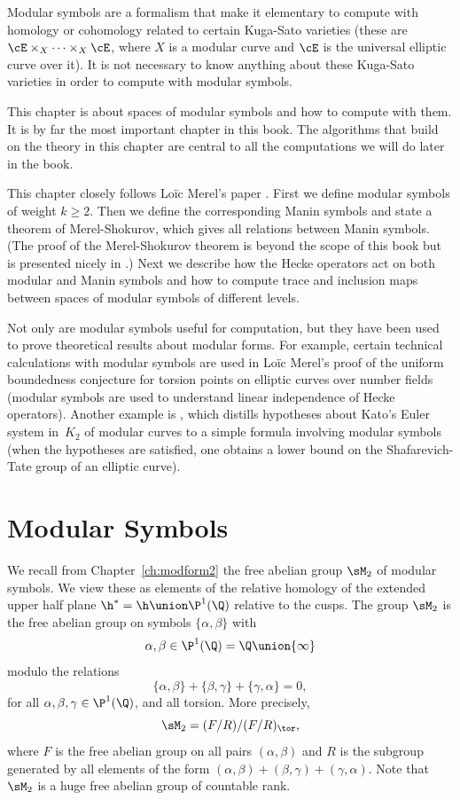 Modular symbols are a formalism that make it 
elementary to compute with homology or cohomology related to certain
Kuga-Sato varieties (these are $\cE\times_X \cdots \times_X \cE$,
where $X$ is a modular curve and $\cE$ is the universal elliptic curve
over it).  It is not necessary to know anything about these Kuga-Sato
varieties in order to compute with modular symbols.

This chapter is about spaces of modular symbols and how to compute
with them.  It is by far the most important chapter in this book.  The
algorithms that build on the theory in this chapter are central to all
the computations we will do later in the book.

This chapter closely follows Lo\"{i}c Merel's paper \cite{merel:1585}.
First we define modular symbols of weight $k\geq 2$.  Then we define
the corresponding Manin symbols and state a theorem of
Merel-Shokurov, which gives all relations between Manin symbols.  (The
proof of the Merel-Shokurov theorem is beyond the scope of this book
but is presented nicely in \cite{gabor:phd}.)
Next we describe how the Hecke operators act on both modular and Manin
symbols and how to compute trace and inclusion maps between spaces of
modular symbols of different levels.

Not only are modular symbols useful for computation, but they have
been used to prove theoretical results about modular forms.  For
example, certain technical calculations with modular symbols are used
in Lo\"{i}c Merel's proof of the uniform boundedness conjecture for
torsion points on elliptic curves over number fields (modular symbols
are used to understand linear independence of Hecke
operators).  Another example is \cite{grigor:phd}, which
distills hypotheses about Kato's Euler system in~$K_2$ of modular
curves to a simple formula involving modular symbols (when the
hypotheses are satisfied, one obtains a lower bound on the
Shafarevich-Tate group of an elliptic curve).

\section{Modular Symbols}\label{sec:modsymgen}
We recall from Chapter~\ref{ch:modform2}
the free abelian group $\sM_2$ of modular symbols.
We view these as elements of the relative 
homology of the extended upper half plane
$\h^* = \h\union \P^1(\Q)$ relative to the cusps.  
The group $\sM_2$
is the free abelian group on symbols $\{\alpha,\beta\}$ with 
$$\alpha, \beta \in \P^1(\Q) = \Q \union \{\infty\}$$
modulo the relations
$$
  \{\alpha,\beta\} + \{\beta,\gamma\} + \{\gamma,\alpha\} = 0,
$$
for all $\alpha,\beta,\gamma\in\P^1(\Q)$, and all torsion.
More precisely, $$\sM_2 =
(F/R)/(F/R)_{\tor},$$ where $F$ is the free abelian group on all pairs
$(\alpha,\beta)$ and $R$ is the subgroup generated by all elements of
the form $(\alpha,\beta) + (\beta,\gamma) + (\gamma,\alpha)$.
Note that $\sM_2$ is a huge free abelian group of countable rank.


